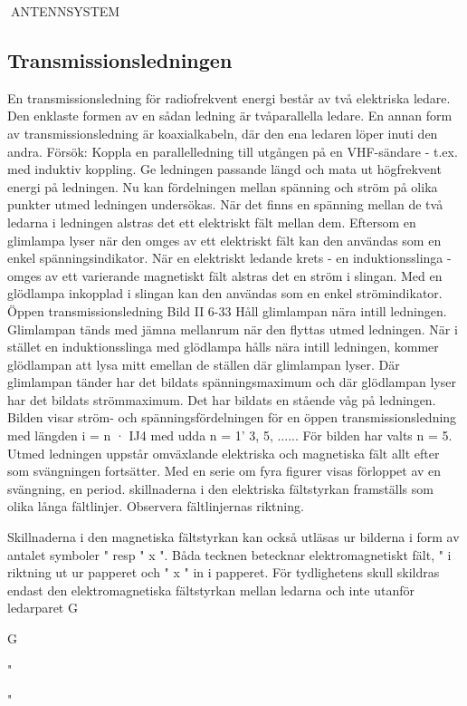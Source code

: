 ANTENNSYSTEM
\subsection{Transmissionsledningen}

En transmissionsledning för radiofrekvent energi består av två elektriska ledare.
Den enklaste formen av en sådan ledning är
tvåparallella ledare. En annan form av transmissionsledning är koaxialkabeln, där den
ena ledaren löper inuti den andra.
Försök: Koppla en parallelledning till utgången på en VHF-sändare - t.ex. med
induktiv koppling. Ge ledningen passande
längd och mata ut högfrekvent energi på
ledningen. Nu kan fördelningen mellan spänning och ström på olika punkter utmed ledningen undersökas. När det finns en spänning mellan de två ledarna i ledningen alstras det ett elektriskt fält mellan dem.
Eftersom en glimlampa lyser när den
omges av ett elektriskt fält kan den användas som en enkel spänningsindikator.
När en elektriskt ledande krets - en induktionsslinga - omges av ett varierande
magnetiskt fält alstras det en ström i slingan.
Med en glödlampa inkopplad i slingan kan
den användas som en enkel strömindikator.
Öppen transmissionsledning
Bild II 6-33
Håll glimlampan nära intill ledningen.
Glimlampan tänds med jämna mellanrum
när den flyttas utmed ledningen.
När i stället en induktionsslinga med glödlampa hålls nära intill ledningen, kommer
glödlampan att lysa mitt emellan de ställen
där glimlampan lyser. Där glimlampan tänder har det bildats spänningsmaximum och
där glödlampan lyser har det bildats strömmaximum. Det har bildats en stående våg
på ledningen.
Bilden visar ström- och spänningsfördelningen för en öppen transmissionsledning med längden i = n · IJ4 med udda n =
1' 3, 5, ......
För bilden har valts n = 5.
Utmed ledningen uppstår omväxlande
elektriska och magnetiska fält allt efter som
svängningen fortsätter. Med en serie om
fyra figurer visas förloppet av en svängning,
en period. skillnaderna i den elektriska fältstyrkan framställs som olika långa fältlinjer.
Observera fältlinjernas riktning.

Skillnaderna i den magnetiska fältstyrkan
kan också utläsas ur bilderna i form av
antalet symboler "
resp " x ". Båda
tecknen betecknar elektromagnetiskt fält, "
i riktning ut ur papperet och " x " in i
papperet. För tydlighetens skull skildras
endast den elektromagnetiska fältstyrkan
mellan ledarna och inte utanför ledarparet
G

G

"

"

